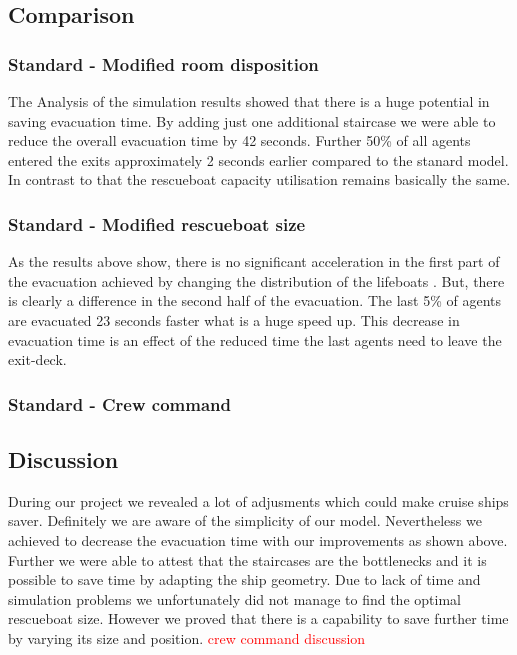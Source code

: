 \documentclass[11pt]{article}
\begin{document}
\subsection{Comparison}
\subsubsection{Standard - Modified room disposition}
The Analysis of the simulation results showed that there is a huge potential in saving evacuation time. By adding just one additional staircase we were able to reduce the overall evacuation time by 42 seconds. Further 50\% of all agents entered the exits approximately 2 seconds earlier compared to the stanard model. In contrast to that the rescueboat capacity utilisation remains basically the same.
\subsubsection{Standard - Modified rescueboat size}

As the results above show, there is no significant acceleration in the first part of the evacuation achieved by changing the distribution of the lifeboats .  
But, there is clearly a difference in the second half of the evacuation. The last 5\% of agents are evacuated 23 seconds faster what is a huge speed up.
This decrease in evacuation time is an effect of the reduced time the last agents need to leave the exit-deck.

\subsubsection{Standard - Crew command}
\subsection{Discussion}

During our project we revealed a lot of adjusments which could make cruise ships saver. Definitely we are aware of the simplicity of our model. Nevertheless we achieved to decrease the evacuation time with our improvements as shown above. Further we were able to attest that the staircases are the bottlenecks and it is possible to save time by adapting the ship geometry. Due to lack of time and simulation problems we unfortunately did not manage to find the optimal rescueboat size. However we proved that there is a capability to save further time by varying its size and position.
\newline
\textcolor{red}{crew command discussion}
\end{document}
